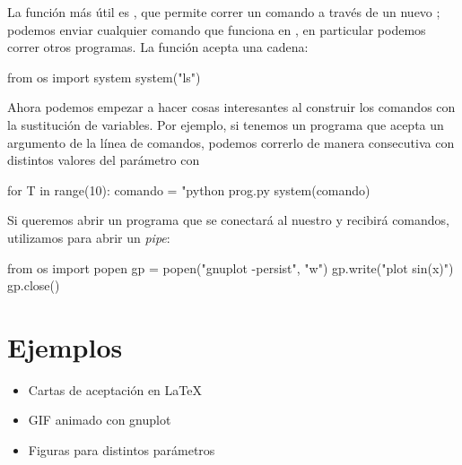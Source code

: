 La función más útil es , que permite correr un comando a través de un nuevo ; podemos enviar cualquier comando que funciona en , en particular podemos correr otros programas. La función acepta una cadena:
\begin{python}
from os import system
system("ls")
\end{python}

Ahora podemos empezar a hacer cosas interesantes al construir los comandos con la sustitución de variables. Por ejemplo, si tenemos un programa  que acepta un argumento de la línea de comandos, podemos correrlo de manera consecutiva con distintos valores del parámetro con
\begin{python}
for T in range(10):
  comando = "python prog.py %
  system(comando)
\end{python}

Si queremos abrir un programa que se conectará al nuestro y recibirá comandos, utilizamos  para abrir un \emph{pipe}:
\begin{python}
from os import popen
gp = popen("gnuplot -persist", "w")
gp.write("plot sin(x)\n")
gp.close()
\end{python}


\section{Ejemplos}

\begin{itemize}
 \item 
Cartas de aceptación en \LaTeX

\item 
GIF animado con gnuplot

\item 
Figuras para distintos parámetros
\end{itemize}

